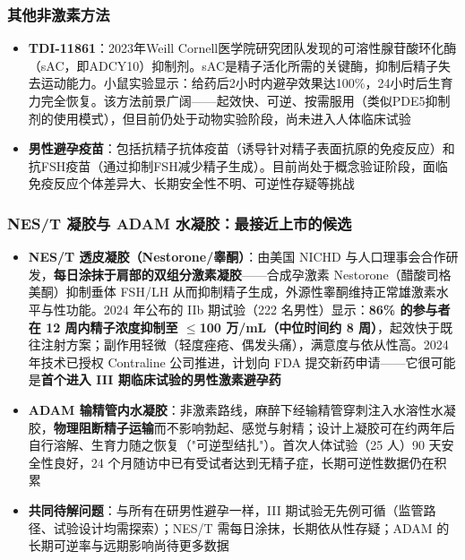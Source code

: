 \subsubsection{其他非激素方法}

\begin{itemize}[leftmargin=2cm]
	\item \textbf{TDI-11861}：2023年Weill Cornell医学院研究团队发现的可溶性腺苷酸环化酶（sAC，即ADCY10）抑制剂。sAC是精子活化所需的关键酶，抑制后精子失去运动能力。小鼠实验显示：给药后2小时内避孕效果达100\%，24小时后生育力完全恢复。该方法前景广阔——起效快、可逆、按需服用（类似PDE5抑制剂的使用模式），但目前仍处于动物实验阶段，尚未进入人体临床试验
	\item \textbf{男性避孕疫苗}：包括抗精子抗体疫苗（诱导针对精子表面抗原的免疫反应）和抗FSH疫苗（通过抑制FSH减少精子生成）。目前尚处于概念验证阶段，面临免疫反应个体差异大、长期安全性不明、可逆性存疑等挑战
\end{itemize}

\subsubsection{NES/T 凝胶与 ADAM 水凝胶：最接近上市的候选}

\begin{itemize}[leftmargin=2cm]
	\item \textbf{NES/T 透皮凝胶（Nestorone/睾酮）}：由美国 NICHD 与人口理事会合作研发，\textbf{每日涂抹于肩部的双组分激素凝胶}——合成孕激素 Nestorone（醋酸司格美酮）抑制垂体 FSH/LH 从而抑制精子生成，外源性睾酮维持正常雄激素水平与性功能。2024 年公布的 IIb 期试验（222 名男性）显示：\textbf{86\% 的参与者在 12 周内精子浓度抑制至 $\leq$100 万/mL（中位时间约 8 周）}，起效快于既往注射方案；副作用轻微（轻度痤疮、偶发头痛），满意度与依从性高。2024 年技术已授权 Contraline 公司推进，计划向 FDA 提交新药申请——它很可能是\textbf{首个进入 III 期临床试验的男性激素避孕药}
	\item \textbf{ADAM 输精管内水凝胶}：非激素路线，麻醉下经输精管穿刺注入水溶性水凝胶，\textbf{物理阻断精子运输}而不影响勃起、感觉与射精；设计上凝胶可在约两年后自行溶解、生育力随之恢复（"可逆型结扎"）。首次人体试验（25 人）90 天安全性良好，24 个月随访中已有受试者达到无精子症，长期可逆性数据仍在积累
	\item \textbf{共同待解问题}：与所有在研男性避孕一样，III 期试验无先例可循（监管路径、试验设计均需探索）；NES/T 需每日涂抹，长期依从性存疑；ADAM 的长期可逆率与远期影响尚待更多数据
\end{itemize}

